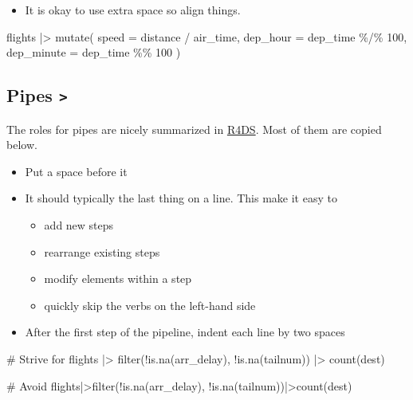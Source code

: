 \documentclass[
  letterpaper,
  DIV=11,
  numbers=noendperiod]{scrreprt}
\newenvironment{Shaded}{\begin{snugshade}}{\end{snugshade}}
\newcommand{\AttributeTok}[1]{\textcolor[rgb]{0.40,0.45,0.13}{#1}}
\newcommand{\CommentTok}[1]{\textcolor[rgb]{0.37,0.37,0.37}{#1}}
\newcommand{\DecValTok}[1]{\textcolor[rgb]{0.68,0.00,0.00}{#1}}
\newcommand{\FunctionTok}[1]{\textcolor[rgb]{0.28,0.35,0.67}{#1}}
\newcommand{\NormalTok}[1]{\textcolor[rgb]{0.00,0.23,0.31}{#1}}
\newcommand{\SpecialCharTok}[1]{\textcolor[rgb]{0.37,0.37,0.37}{#1}}
\providecommand{\tightlist}{%
  \setlength{\itemsep}{0pt}\setlength{\parskip}{0pt}}\usepackage{longtable,booktabs,array}
\begin{document}
\begin{itemize}
\tightlist
\item
  It is okay to use extra space so align things.
\end{itemize}

\begin{Shaded}
\begin{Highlighting}[]
\NormalTok{flights }\SpecialCharTok{|\textgreater{}} 
  \FunctionTok{mutate}\NormalTok{(}
    \AttributeTok{speed      =}\NormalTok{ distance }\SpecialCharTok{/}\NormalTok{ air\_time,}
    \AttributeTok{dep\_hour   =}\NormalTok{ dep\_time }\SpecialCharTok{\%/\%} \DecValTok{100}\NormalTok{,}
    \AttributeTok{dep\_minute =}\NormalTok{ dep\_time }\SpecialCharTok{\%\%}  \DecValTok{100}
\NormalTok{  )}
\end{Highlighting}
\end{Shaded}

\subsection{\texorpdfstring{Pipes
\texttt{\textbar{}\textgreater{}}}{Pipes \textbar\textgreater{}}}\label{pipes}

The roles for pipes are nicely summarized in
\href{https://r4ds.hadley.nz/workflow-style\#sec-pipes}{R4DS}. Most of
them are copied below.

\begin{itemize}
\tightlist
\item
  Put a space before it
\item
  It should typically the last thing on a line. This make it easy to

  \begin{itemize}
  \tightlist
  \item
    add new steps
  \item
    rearrange existing steps
  \item
    modify elements within a step
  \item
    quickly skip the verbs on the left-hand side
  \end{itemize}
\item
  After the first step of the pipeline, indent each line by two spaces
\end{itemize}

\begin{Shaded}
\begin{Highlighting}[]
\CommentTok{\# Strive for }
\NormalTok{flights }\SpecialCharTok{|\textgreater{}}  
  \FunctionTok{filter}\NormalTok{(}\SpecialCharTok{!}\FunctionTok{is.na}\NormalTok{(arr\_delay), }\SpecialCharTok{!}\FunctionTok{is.na}\NormalTok{(tailnum)) }\SpecialCharTok{|\textgreater{}} 
  \FunctionTok{count}\NormalTok{(dest)}

\CommentTok{\# Avoid}
\NormalTok{flights}\SpecialCharTok{|\textgreater{}}\FunctionTok{filter}\NormalTok{(}\SpecialCharTok{!}\FunctionTok{is.na}\NormalTok{(arr\_delay), }\SpecialCharTok{!}\FunctionTok{is.na}\NormalTok{(tailnum))}\SpecialCharTok{|\textgreater{}}\FunctionTok{count}\NormalTok{(dest)}
\end{Highlighting}
\end{Shaded}
\end{document}
